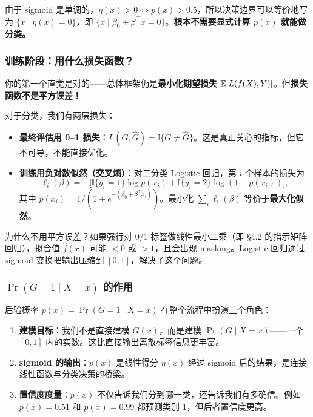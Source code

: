 由于 sigmoid 是单调的，$\eta(x) > 0 \iff p(x) > 0.5$，所以决策边界可以等价地写为 $\{x \mid \eta(x) = 0\}$，即 $\{x \mid \beta_0 + \beta^\top x = 0\}$。\textbf{根本不需要显式计算 $p(x)$ 就能做分类。}

\subsubsection{训练阶段：用什么损失函数？}

你的第一个直觉是对的——总体框架仍是\textbf{最小化期望损失} $\mathbb{E}[L(f(X), Y)]$。但\textbf{损失函数不是平方误差！}

对于分类，我们有两层损失：

\begin{itemize}
    \item \textbf{最终评估用 0--1 损失}：$L(G, \hat{G}) = \mathbb{I}\{G \neq \hat{G}\}$。这是真正关心的指标，但它不可导，不能直接优化。
    \item \textbf{训练用负对数似然（交叉熵）}：对二分类 Logistic 回归，第 $i$ 个样本的损失为
    \begin{equation}\label{eq:logistic_loss}
        \ell_i(\beta) = -\Big[ \mathbb{I}\{y_i = 1\} \log p(x_i) + \mathbb{I}\{y_i = 2\} \log(1 - p(x_i)) \Big],
    \end{equation}
    其中 $p(x_i) = 1/(1 + e^{-(\beta_0 + \beta^\top x_i)})$。最小化 $\sum_i \ell_i(\beta)$ 等价于\textbf{最大化似然}。
\end{itemize}

\begin{remark}
为什么不用平方误差？如果强行对 0/1 标签做线性最小二乘（即 §4.2 的指示矩阵回归），拟合值 $\hat{f}(x)$ 可能 $<0$ 或 $>1$，且会出现 masking。Logistic 回归通过 sigmoid 变换把输出压缩到 $[0,1]$，解决了这个问题。
\end{remark}

\subsubsection{$\Pr(G=1\mid X=x)$ 的作用}

后验概率 $p(x) = \Pr(G=1 \mid X=x)$ 在整个流程中扮演三个角色：

\begin{enumerate}[label=(\arabic*)]
    \item \textbf{建模目标}：我们不是直接建模 $G(x)$，而是建模 $\Pr(G \mid X=x)$——一个 $[0,1]$ 内的实数。这比直接输出离散标签信息更丰富。
    \item \textbf{sigmoid 的输出}：$p(x)$ 是线性得分 $\eta(x)$ 经过 sigmoid 后的结果，是连接线性函数与分类决策的桥梁。
    \item \textbf{置信度度量}：$p(x)$ 不仅告诉我们分到哪一类，还告诉我们有多确信。例如 $p(x)=0.51$ 和 $p(x)=0.99$ 都预测类别 1，但后者置信度更高。
\end{enumerate}


